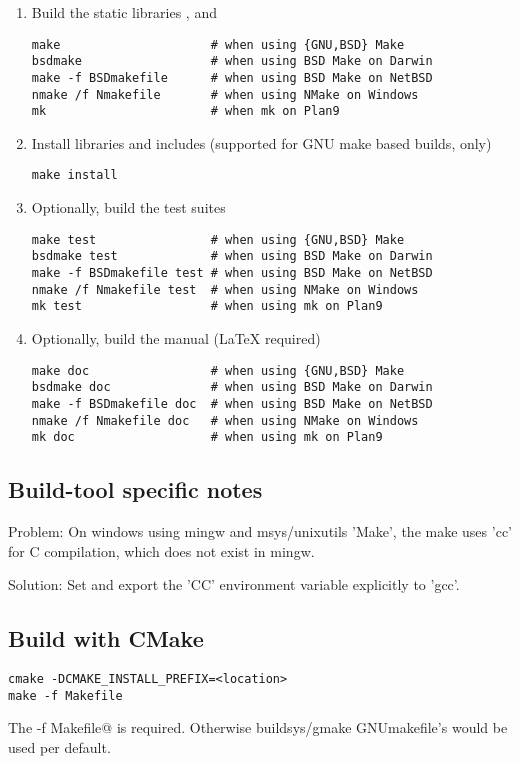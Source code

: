 \begin{enumerate}
\item Build the static libraries ,  and 
\begin{lstlisting}
make                     # when using {GNU,BSD} Make
bsdmake                  # when using BSD Make on Darwin
make -f BSDmakefile      # when using BSD Make on NetBSD
nmake /f Nmakefile       # when using NMake on Windows
mk                       # when mk on Plan9
\end{lstlisting}
\item Install libraries and includes (supported for GNU make based builds, only)
\begin{lstlisting}
make install 
\end{lstlisting}
\item Optionally, build the test suites
\begin{lstlisting}
make test                # when using {GNU,BSD} Make
bsdmake test             # when using BSD Make on Darwin
make -f BSDmakefile test # when using BSD Make on NetBSD
nmake /f Nmakefile test  # when using NMake on Windows
mk test                  # when using mk on Plan9
\end{lstlisting}%
\item Optionally, build the manual (LaTeX required)
\begin{lstlisting}
make doc                 # when using {GNU,BSD} Make
bsdmake doc              # when using BSD Make on Darwin
make -f BSDmakefile doc  # when using BSD Make on NetBSD
nmake /f Nmakefile doc   # when using NMake on Windows
mk doc                   # when using mk on Plan9
\end{lstlisting}%
\end{enumerate}

\subsection{Build-tool specific notes}

Problem: On windows using mingw and msys/unixutils 'Make', the make uses
'cc' for C compilation, which does not exist in mingw.

Solution: Set and export the 'CC' environment variable explicitly to 'gcc'. 

\subsection{Build with CMake}

\begin{lstlisting}
cmake -DCMAKE_INSTALL_PREFIX=<location>
make -f Makefile
\end{lstlisting}

The \verb@-f Makefile@ is required. Otherwise buildsys/gmake GNUmakefile's 
would be used per default.


